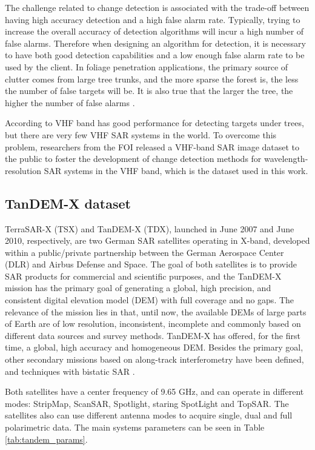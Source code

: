 The challenge related to change detection is associated with the trade-off between having high accuracy detection and a high false alarm rate. Typically, trying to increase the overall accuracy of detection algorithms will incur a high number of false alarms. Therefore when designing an algorithm for detection, it is necessary to have both good detection capabilities and a low enough false alarm rate to be used by the client. In foliage penetration applications, the primary source of clutter comes from large tree trunks, and the more sparse the forest is, the less the number of false targets will be. It is also true that the larger the tree, the higher the number of false alarms \cite{Book_ML}.

According to \cite{Carabas} VHF band has good performance for detecting targets under trees, but there are very few VHF SAR systems in the world. To overcome this problem, researchers from the FOI released a VHF-band SAR image dataset to the public to foster the development of change detection methods for wavelength-resolution SAR systems in the VHF band, which is the dataset used in this work.

\subsection{TanDEM-X dataset}
TerraSAR-X (TSX) and TanDEM-X (TDX), launched in June 2007 and June 2010,
respectively, are two German SAR satellites operating in X-band, developed within a
public/private partnership between the German Aerospace Center (DLR) and Airbus
Defense and Space.
The goal of both satellites is to provide SAR products for commercial and scientific purposes, and the TanDEM-X mission has the primary goal of generating a global,
high precision, and consistent digital elevation model (DEM) with full coverage and no
gaps. The relevance of the mission lies in that, until now, the available DEMs of large
parts of Earth are of low resolution, inconsistent, incomplete and commonly based on
different data sources and survey methods.
TanDEM-X has offered, for the first time, a global, high accuracy and homogeneous DEM.
Besides the primary goal, other secondary missions based on along-track interferometry have
been defined, and techniques with bistatic SAR \cite{Alberto}.

Both satellites have a center frequency of 9.65 GHz, and can operate in different modes: StripMap, ScanSAR, Spotlight, staring SpotLight and TopSAR. The satellites also can use different antenna modes to acquire single, dual and full polarimetric data. The main systems parameters can be seen in Table \ref{tab:tandem_params}.

